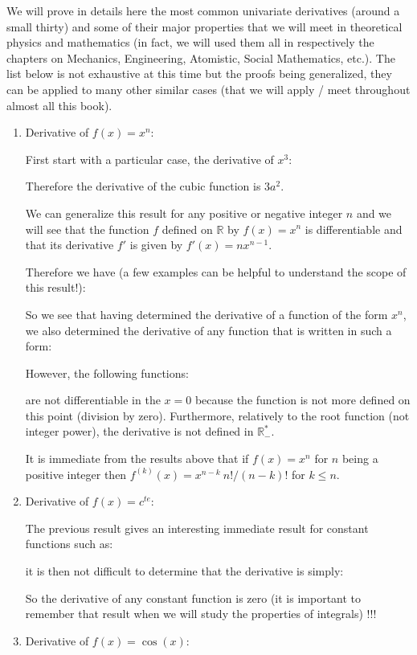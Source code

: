 	 We will prove in details here the most common univariate derivatives (around a small thirty) and some of their major properties that we will meet in theoretical physics and mathematics (in fact, we will used them all in respectively the chapters on Mechanics, Engineering, Atomistic, Social Mathematics, etc.). The list below is not exhaustive at this time but the proofs being generalized, they can be applied to many other similar cases (that we will apply / meet throughout almost all this book).
	 \begin{enumerate}
	 	\item Derivative of $f(x)=x^n$:
	 	
	 	First start with a particular case, the derivative of $x^3$:
	 	
		Therefore the derivative of the cubic function is $3a^2$.
		
		We can generalize this result for any positive or negative integer $n$ and we will see that the function $f$ defined on $\mathbb{R}$ by $f(x)=x^n$ is differentiable and that its derivative $f'$ is given by $f'(x)=nx^{n-1}$.
		 
		 Therefore we have (a few examples can be helpful to understand the scope of this result!):
		 
		 So we see that having determined the derivative of a function of the form $x^n$, we also determined the derivative of any function that is written in such a form:
		 
		 However, the following functions:
		 
		 are not differentiable in the $x=0$ because the function is not more defined on this point (division by zero). Furthermore, relatively to the root function (not integer power), the derivative is not defined in $\mathbb{R}_{-}^{*}$.
		 
		 \begin{tcolorbox}[title=Remarks,colframe=black,arc=10pt]
		It is immediate from the results above that if $f(x)=x^n$ for $n$ being a positive integer then $f^{(k)}(x) = x^{n-k}\ n!/(n-k)!$ for $k\leq n$.
		\end{tcolorbox}	
		 
		 \item Derivative of $f(x)=c^{te}$:
		 
		 The previous result gives an interesting immediate result for constant functions such as:
		 
		 it is then not difficult to determine that the derivative is simply:
		 
		 So the derivative of any constant function is zero (it is important to remember that result when we will study the properties of integrals) !!!
		 \item Derivative of $f(x)=\cos(x)$:
		 

\end{enumerate}
